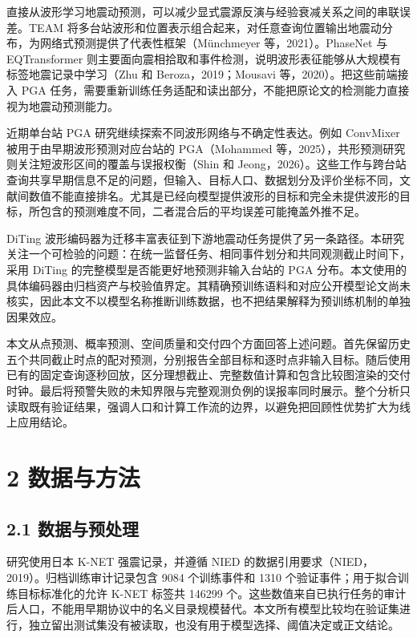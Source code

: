 \documentclass[UTF8,a4paper,11pt]{ctexart}
\begin{document}
直接从波形学习地震动预测，可以减少显式震源反演与经验衰减关系之间的串联误差。TEAM 将多台站波形和位置表示组合起来，对任意查询位置输出地震动分布，为网络式预测提供了代表性框架（Münchmeyer 等，2021）。PhaseNet 与 EQTransformer 则主要面向震相拾取和事件检测，说明波形表征能够从大规模有标签地震记录中学习（Zhu 和 Beroza，2019；Mousavi 等，2020）。把这些前端接入 PGA 任务，需要重新训练任务适配和读出部分，不能把原论文的检测能力直接视为地震动预测能力。

近期单台站 PGA 研究继续探索不同波形网络与不确定性表达。例如 ConvMixer 被用于由早期波形预测对应台站的 PGA（Mohammed 等，2025），共形预测研究则关注短波形区间的覆盖与误报权衡（Shin 和 Jeong，2026）。这些工作与跨台站查询共享早期信息不足的问题，但输入、目标人口、数据划分及评价坐标不同，文献间数值不能直接排名。尤其是已经向模型提供波形的目标和完全未提供波形的目标，所包含的预测难度不同，二者混合后的平均误差可能掩盖外推不足。

DiTing 波形编码器为迁移丰富表征到下游地震动任务提供了另一条路径。本研究关注一个可检验的问题：在统一监督任务、相同事件划分和共同观测截止时间下，采用 DiTing 的完整模型是否能更好地预测非输入台站的 PGA 分布。本文使用的具体编码器由归档资产与校验值界定。其精确预训练语料和对应公开模型论文尚未核实，因此本文不以模型名称推断训练数据，也不把结果解释为预训练机制的单独因果效应。

本文从点预测、概率预测、空间质量和交付四个方面回答上述问题。首先保留历史五个共同截止时点的配对预测，分别报告全部目标和逐时点非输入目标。随后使用已有的固定查询逐秒回放，区分理想截止、完整数值计算和包含比较图渲染的交付时钟。最后将预警失败的未知界限与完整观测负例的误报率同时展示。整个分析只读取既有验证结果，强调人口和计算工作流的边界，以避免把回顾性优势扩大为线上应用结论。

\section*{2 数据与方法}

\subsection*{2.1 数据与预处理}

研究使用日本 K-NET 强震记录，并遵循 NIED 的数据引用要求（NIED，2019）。归档训练审计记录包含 9084 个训练事件和 1310 个验证事件；用于拟合训练目标标准化的允许 K-NET 标签共 146299 个。这些数值来自已执行任务的审计后人口，不能用早期协议中的名义目录规模替代。本文所有模型比较均在验证集进行，独立留出测试集没有被读取，也没有用于模型选择、阈值决定或正文结论。
\end{document}
